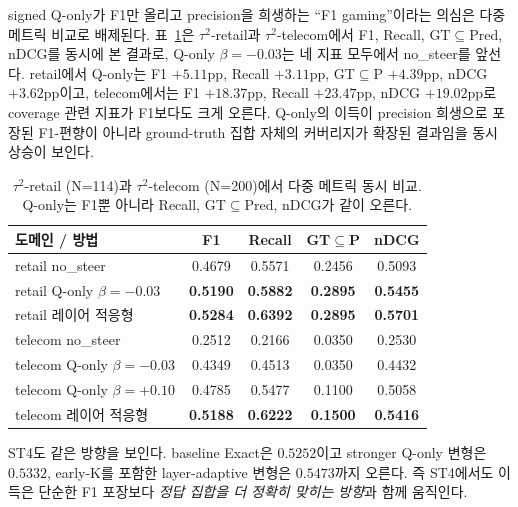 signed Q-only가 F1만 올리고 precision을 희생하는 ``F1 gaming''이라는 의심은 다중 메트릭 비교로 배제된다. 표~\ref{tab:multi-metric}은 $\tau^2$-retail과 $\tau^2$-telecom에서 F1, Recall, GT$\subseteq$Pred, nDCG를 동시에 본 결과로, Q-only $\beta{=}{-}0.03$는 네 지표 모두에서 no\_steer를 앞선다. retail에서 Q-only는 F1 $+5.11$pp, Recall $+3.11$pp, GT$\subseteq$P $+4.39$pp, nDCG $+3.62$pp이고, telecom에서는 F1 $+18.37$pp, Recall $+23.47$pp, nDCG $+19.02$pp로 coverage 관련 지표가 F1보다도 크게 오른다. Q-only의 이득이 precision 희생으로 포장된 F1-편향이 아니라 ground-truth 집합 자체의 커버리지가 확장된 결과임을 동시 상승이 보인다.

\begin{table}[t]
\centering
\caption{$\tau^2$-retail (N=114)과 $\tau^2$-telecom (N=200)에서 다중 메트릭 동시 비교. Q-only는 F1뿐 아니라 Recall, GT$\subseteq$Pred, nDCG가 같이 오른다.}
\label{tab:multi-metric}
\small
\begin{tabularx}{\linewidth}{@{}Xcccc@{}}
\toprule
도메인 / 방법 & F1 & Recall & GT$\subseteq$P & nDCG \\
\midrule
retail no\_steer & 0.4679 & 0.5571 & 0.2456 & 0.5093 \\
retail Q-only $\beta{=}{-}0.03$ & \textbf{0.5190} & \textbf{0.5882} & \textbf{0.2895} & \textbf{0.5455} \\
retail 레이어 적응형 & \textbf{0.5284} & \textbf{0.6392} & \textbf{0.2895} & \textbf{0.5701} \\
\midrule
telecom no\_steer & 0.2512 & 0.2166 & 0.0350 & 0.2530 \\
telecom Q-only $\beta{=}{-}0.03$ & 0.4349 & 0.4513 & 0.0350 & 0.4432 \\
telecom Q-only $\beta{=}{+}0.10$ & 0.4785 & 0.5477 & 0.1100 & 0.5058 \\
telecom 레이어 적응형 & \textbf{0.5188} & \textbf{0.6222} & \textbf{0.1500} & \textbf{0.5416} \\
\bottomrule
\end{tabularx}
\end{table}

ST4도 같은 방향을 보인다. baseline Exact은 $0.5252$이고 stronger Q-only 변형은 $0.5332$, early-K를 포함한 layer-adaptive 변형은 $0.5473$까지 오른다. 즉 ST4에서도 이득은 단순한 F1 포장보다 \emph{정답 집합을 더 정확히 맞히는 방향}과 함께 움직인다.

